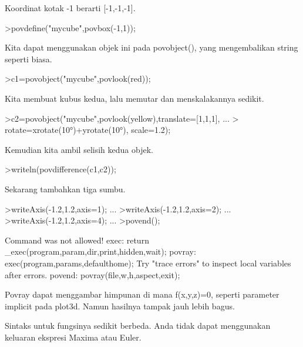 \documentclass[a4paper,10pt]{article}
\begin{document}
\begin{eulernotebook}
\begin{eulercomment}
Koordinat kotak -1 berarti [-1,-1,-1].
\end{eulercomment}
\begin{eulerprompt}
>povdefine("mycube",povbox(-1,1));
\end{eulerprompt}
\begin{eulercomment}
Kita dapat menggunakan objek ini pada povobject(), yang mengembalikan string seperti biasa.
\end{eulercomment}
\begin{eulerprompt}
>c1=povobject("mycube",povlook(red));
\end{eulerprompt}
\begin{eulercomment}
Kita membuat kubus kedua, lalu memutar dan menskalakannya sedikit.
\end{eulercomment}
\begin{eulerprompt}
>c2=povobject("mycube",povlook(yellow),translate=[1,1,1], ...
>  rotate=xrotate(10°)+yrotate(10°), scale=1.2);
\end{eulerprompt}
\begin{eulercomment}
Kemudian kita ambil selisih kedua objek.
\end{eulercomment}
\begin{eulerprompt}
>writeln(povdifference(c1,c2));
\end{eulerprompt}
\begin{eulercomment}
Sekarang tambahkan tiga sumbu.
\end{eulercomment}
\begin{eulerprompt}
>writeAxis(-1.2,1.2,axis=1); ...
>writeAxis(-1.2,1.2,axis=2); ...
>writeAxis(-1.2,1.2,axis=4); ...
>povend();
\end{eulerprompt}
\begin{euleroutput}
  Command was not allowed!
  exec:
      return _exec(program,param,dir,print,hidden,wait);
  povray:
      exec(program,params,defaulthome);
  Try "trace errors" to inspect local variables after errors.
  povend:
      povray(file,w,h,aspect,exit); 
\end{euleroutput}
\begin{eulercomment}
Povray dapat menggambar himpunan di mana f(x,y,z)=0, seperti parameter implicit pada plot3d. Namun hasilnya tampak
jauh lebih bagus.

Sintaks untuk fungsinya sedikit berbeda. Anda tidak dapat menggunakan keluaran ekspresi Maxima atau Euler.


\end{eulercomment}
\end{eulernotebook}
\end{document}
